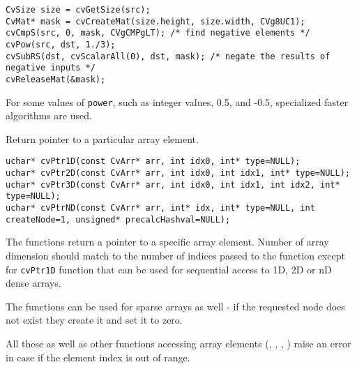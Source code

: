 \begin{lstlisting}
CvSize size = cvGetSize(src);
CvMat* mask = cvCreateMat(size.height, size.width, CVg8UC1);
cvCmpS(src, 0, mask, CVgCMPgLT); /* find negative elements */
cvPow(src, dst, 1./3);
cvSubRS(dst, cvScalarAll(0), dst, mask); /* negate the results of negative inputs */
cvReleaseMat(&mask);
\end{lstlisting}

For some values of \texttt{power}, such as integer values, 0.5, and -0.5, specialized faster algorithms are used.

\ifC
{}
Return pointer to a particular array element.

\begin{lstlisting}
uchar* cvPtr1D(const CvArr* arr, int idx0, int* type=NULL);
uchar* cvPtr2D(const CvArr* arr, int idx0, int idx1, int* type=NULL);
uchar* cvPtr3D(const CvArr* arr, int idx0, int idx1, int idx2, int* type=NULL);
uchar* cvPtrND(const CvArr* arr, int* idx, int* type=NULL, int createNode=1, unsigned* precalcHashval=NULL);
\end{lstlisting}

\begin{description}
\end{description}

The functions return a pointer to a specific array element. Number of array dimension should match to the number of indices passed to the function except for \texttt{cvPtr1D} function that can be used for sequential access to 1D, 2D or nD dense arrays.

The functions can be used for sparse arrays as well - if the requested node does not exist they create it and set it to zero.

All these as well as other functions accessing array elements (, , 
, ) raise an error in case if the element index is out of range.

